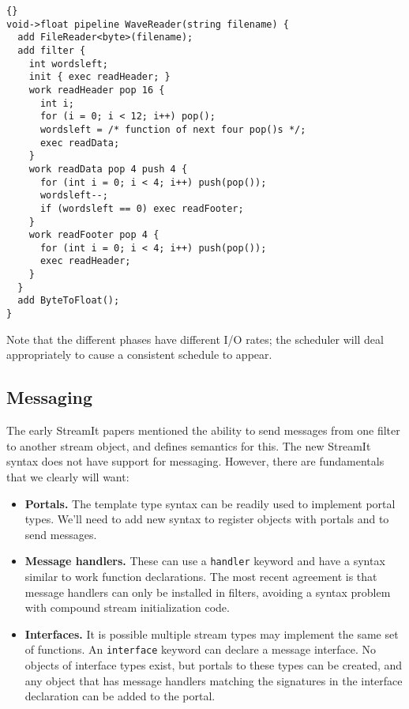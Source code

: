 \documentclass[11pt]{article}
\begin{document}
\begin{lstlisting}{}
void->float pipeline WaveReader(string filename) {
  add FileReader<byte>(filename);
  add filter {
    int wordsleft;
    init { exec readHeader; }
    work readHeader pop 16 {
      int i;
      for (i = 0; i < 12; i++) pop();
      wordsleft = /* function of next four pop()s */;
      exec readData;
    }
    work readData pop 4 push 4 {
      for (int i = 0; i < 4; i++) push(pop());
      wordsleft--;
      if (wordsleft == 0) exec readFooter;
    }
    work readFooter pop 4 {
      for (int i = 0; i < 4; i++) push(pop());
      exec readHeader;
    }
  }
  add ByteToFloat();
}
\end{lstlisting}

Note that the different phases have different I/O rates; the scheduler
will deal appropriately to cause a consistent schedule to appear.

\subsection{Messaging}

The early StreamIt papers mentioned the ability to send messages from
one filter to another stream object, and defines semantics for this.
The new StreamIt syntax does not have support for messaging.  However,
there are fundamentals that we clearly will want:

\begin{itemize}

\item \textbf{Portals.}  The template type syntax can be readily used
  to implement portal types.  We'll need to add new syntax to register
  objects with portals and to send messages.

\item \textbf{Message handlers.}  These can use a \lstinline|handler|
  keyword and have a syntax similar to work function declarations.
  The most recent agreement is that message handlers can only be
  installed in filters, avoiding a syntax problem with compound stream
  initialization code.

\item \textbf{Interfaces.}  It is possible multiple stream types may
  implement the same set of functions.  An \lstinline|interface|
  keyword can declare a message interface.  No objects of interface
  types exist, but portals to these types can be created, and any
  object that has message handlers matching the signatures in the
  interface declaration can be added to the portal.

\end{itemize}
\end{document}
